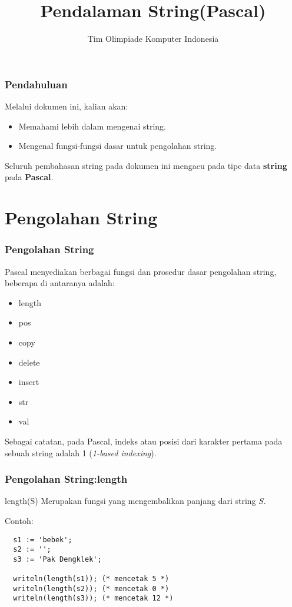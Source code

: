 

\title{Pendalaman String\newline (Pascal)}
\author{Tim Olimpiade Komputer Indonesia}
\date{}



\begin{frame}
\titlepage
\end{frame}

\begin{frame}
\frametitle{Pendahuluan}
Melalui dokumen ini, kalian akan:
\begin{itemize}
  \item Memahami lebih dalam mengenai string.
  \item Mengenal fungsi-fungsi dasar untuk pengolahan string.
\end{itemize}
\vfill
Seluruh pembahasan string pada dokumen ini mengacu pada tipe data \textbf{string} pada \textbf{Pascal}.
\end{frame}

\section{Pengolahan String}
\frame{\sectionpage}

\begin{frame}
\frametitle{Pengolahan String}
Pascal menyediakan berbagai fungsi dan prosedur dasar pengolahan string, beberapa di antaranya adalah:
\begin{itemize}
  \item length
  \item pos
  \item copy
  \item delete
  \item insert
  \item str
  \item val
\end{itemize}

Sebagai catatan, pada Pascal, indeks atau posisi dari karakter pertama pada sebuah string adalah 1 (\textit{1-based indexing}).
\end{frame}

\begin{frame}[fragile]
\frametitle{Pengolahan String:\newline length}
\begin{block}{length(S)}
Merupakan fungsi yang mengembalikan panjang dari string $S$.
\end{block}

Contoh:
\begin{lstlisting}
  s1 := 'bebek';
  s2 := '';
  s3 := 'Pak Dengklek';

  writeln(length(s1)); (* mencetak 5 *)
  writeln(length(s2)); (* mencetak 0 *)
  writeln(length(s3)); (* mencetak 12 *)
\end{lstlisting}
\end{frame}


